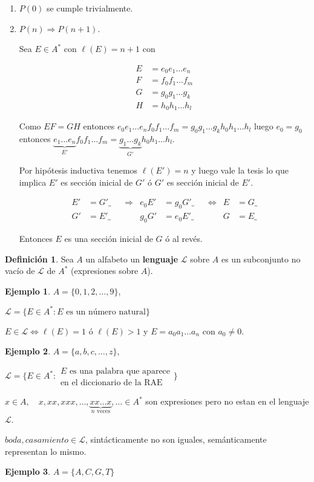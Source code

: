 \documentclass[a4paper,11pt]{article}
\theoremstyle{definition}
\newtheorem{defn}{Definición}[section]
\newtheorem{exap}{Ejemplo}[section]
\theoremstyle{remark}
\begin{document}
\begin{enumerate}
\item $P(0)$ se cumple trivialmente.
\item $P(n) \Rightarrow P(n+1)$.

Sea $E \in A^*$ con $\ell(E) = n+1$ con 

\[ 
\begin{align*}
E &= e_0e_1\dots e_n \\
F &= f_0f_1\dots f_m \\
G &= g_0g_1\dots g_k \\
H &= h_0h_1\dots h_l
\end{align*}
\]

Como $EF = GH$ entonces $e_0e_1\dots e_nf_0f_1\dots f_m = g_0g_1\dots g_kh_0h_1\dots h_l$
luego $e_0 = g_0$ entonces $\underbrace{e_1\dots e_n}_{E'}f_0f_1\dots f_m 
= \underbrace{g_1\dots g_k}_{G'}h_0h_1\dots h_l$.

Por hipótesis inductiva tenemos $\ell(E') = n$ y luego vale la tesis 
lo que implica $E'$ es sección inicial de $G'$ ó $G'$ es sección
inicial de $E'$.

\[
\begin{align*}
E' &= G'\_ & &\Rightarrow & e_0E' &= g_0 G'\_ & &\iff & E &= G\_\\
G' &= E'\_ & & & g_0 G' &= e_0 E'\_ & & & G &= E\_
\end{align*}
\]

Entonces $E$ es una sección inicial de $G$ ó al revés.
\end{enumerate}

\begin{defn}
Sea $A$ un alfabeto un \textbf{lenguaje} $\mathcal L$ sobre $A$ 
es un subconjunto no vacío de $\mathcal L$ de $A^*$ (expresiones sobre $A$).
\end{defn}

\begin{exap}
$A = \{0, 1, 2, \dots, 9\}$, 

$\mathcal L = \{ E \in A^* : 
E \textrm{ es un número natural} \}$

$E \in \mathcal L \iff \ell(E) = 1$ ó $\ell(E) > 1$ y 
$E = a_0a_1\dots a_n$ con $a_0 \ne 0$.
\end{exap}

\begin{exap}
$A = \{a, b, c, \dots, z\}$, 

$\mathcal L = \{ E \in A^* : 
\substack{E \text{ es una palabra que aparece} \\ \text{en el diccionario de la RAE}}\}$

$x \in A,\quad x, xx, xxx, \dots, \underbrace{xx\dots x}_{n\textrm{ veces}} 
, \dots\in A^*$ son expresiones pero no estan en el lenguaje $\mathcal L$.

$boda, casamiento \in \mathcal L$, sintácticamente no son iguales,
semánticamente representan lo mismo.
\end{exap}

\begin{exap}
$A = \{A,C,G,T\}$
\end{exap}
\end{document}
